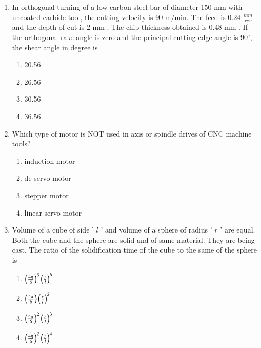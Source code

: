 \documentclass[journal]{IEEEtran}
\begin{document}
\begin{enumerate}
       \item In orthogonal turning of a low carbon steel bar of diameter 150 mm with uncoated carbide tool, the cutting velocity is 90 m/min. The feed is 0.24 $\frac{mm}{rev}$ and the depth of cut is 2 mm . The chip thickness obtained is 0.48 mm . If the orthogonal rake angle is zero and the principal cutting edge angle is $90^{\circ}$, the shear angle in degree is
        \begin{multicols}{4}
            \begin{enumerate}
                \item 20.56
                \item 26.56
                \item 30.56
                \item 36.56
            \end{enumerate}
        \end{multicols}


    \item Which type of motor is NOT used in axis or spindle drives of CNC machine tools?


		\begin{multicols}{1}
			\begin{enumerate}
	\item induction motor
    \item de servo motor
    \item stepper motor
    \item linear servo motor
			\end{enumerate}
		\end{multicols}


    \item Volume of a cube of side ' $l$ ' and volume of a sphere of radius ' $r$ ' are equal. Both the cube and the sphere are solid and of same material. They are being cast. The ratio of the solidification time of the cube to the same of the sphere is
        \begin{multicols}{4}
            \begin{enumerate}
              \item $\left(\frac{4 \pi}{6}\right)^{3}\left(\frac{r}{l}\right)^{6}$
              \item $\left(\frac{4 \pi}{6}\right)\left(\frac{r}{l}\right)^{2}$
              \item $\left(\frac{4 \pi}{6}\right)^{2}\left(\frac{r}{l}\right)^{3}$
              \item $\left(\frac{4 \pi}{6}\right)^{2}\left(\frac{r}{l}\right)^{4}$
            \end{enumerate}
        \end{multicols}



\end{enumerate}
\end{document}
